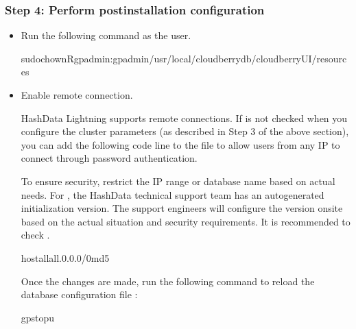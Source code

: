 \documentclass[letterpaper,10pt,english]{sphinxmanual}
\begin{document}
\subsubsection{Step 4: Perform post\sphinxhyphen{}installation configuration}
\label{\detokenize{deploy-guides/physical-deploy/visualized-deploy:step-4-perform-post-installation-configuration}}\begin{itemize}
\item {} 
\sphinxAtStartPar
Run the following command as the  user.

\begin{sphinxVerbatim}[commandchars=\\\{\}]
sudochown\PYGZhy{}Rgpadmin:gpadmin/usr/local/cloudberry\PYGZhy{}db/cloudberryUI/resources
\end{sphinxVerbatim}

\item {} 
\sphinxAtStartPar
Enable remote connection.

\sphinxAtStartPar
HashData Lightning supports remote connections. If  is not checked when you configure the cluster parameters (as described in Step 3 of the above  section), you can add the following code line to the  file to allow users from any IP to connect through password authentication.

\sphinxAtStartPar
To ensure security, restrict the IP range or database name based on actual needs. For , the HashData technical support team has an auto\sphinxhyphen{}generated initialization version. The support engineers will configure the version on\sphinxhyphen{}site based on the actual situation and security requirements. It is recommended to check .

\begin{sphinxVerbatim}[commandchars=\\\{\}]
hostallall.0.0.0/0md5
\end{sphinxVerbatim}

\sphinxAtStartPar
Once the changes are made, run the following command to reload the database configuration file :

\begin{sphinxVerbatim}[commandchars=\\\{\}]
gpstop\PYGZhy{}u
\end{sphinxVerbatim}


\end{itemize}
\end{document}
